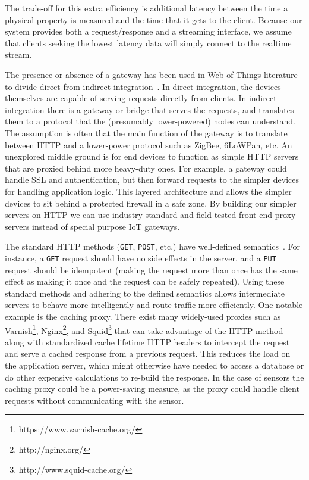 \documentclass{acm_proc_article-sp}
\begin{document}
The trade-off for this extra efficiency is additional latency between the time
a physical property is measured and the time that it gets to the client.
Because our system provides both a request/response and a streaming interface,
we assume that clients seeking the lowest latency data will simply connect to
the realtime stream.

The presence or absence of a gateway has been used in Web of Things literature
to divide direct from indirect integration~\cite{wotsurvey}. In direct
integration, the devices themselves are capable of serving requests directly
from clients. In indirect integration there is a gateway or bridge that serves
the requests, and translates them to a protocol that the (presumably
lower-powered) nodes can understand. The assumption is often that the main
function of the gateway is to translate between HTTP and a lower-power protocol
such as ZigBee, 6LoWPan, etc. An unexplored middle ground is for end devices to
function as simple HTTP servers that are proxied behind more heavy-duty ones.
For example, a gateway could handle SSL and authentication, but then forward
requests to the simpler devices for handling application logic. This layered
architecture  and allows the simpler devices to sit behind a protected firewall
in a safe zone. By building our simpler servers on HTTP we can use
industry-standard and field-tested front-end proxy servers instead of special
purpose IoT gateways.

The standard HTTP methods (\texttt{GET}, \texttt{POST}, etc.) have well-defined
semantics~\cite{httpmethods}. For instance, a \texttt{GET} request should have
no side effects in the server, and a \texttt{PUT} request should be idempotent
(making the request more than once has the same effect as making it once and
the request can be safely repeated). Using these standard methods and adhering
to the defined semantics allows intermediate servers to behave more
intelligently and route traffic more efficiently. One notable example is the
caching proxy. There exist many widely-used proxies such as
Varnish\footnote{https://www.varnish-cache.org/},
Nginx\footnote{http://nginx.org/}, and
Squid\footnote{http://www.squid-cache.org/} that can take advantage of the HTTP
method along with standardized cache lifetime HTTP headers to intercept the
request and serve a cached response from a previous request. This reduces the
load on the application server, which might otherwise have needed to access a
database or do other expensive calculations to re-build the response. In the
case of sensors the caching proxy could be a power-saving measure, as the proxy
could handle client requests without communicating with the sensor.
\end{document}
